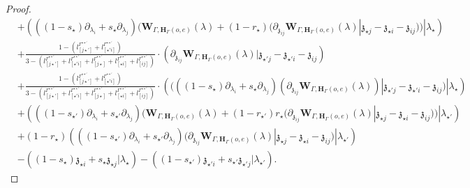 \documentclass[11pt]{amsart}
\theoremstyle{definition}
\theoremstyle{remark}
\numberwithin{equation}{section}
\begin{document}
\begin{proof}
\begin{align*}
&+\left(((1-s_{\star})\partial_{\lambda_i}+s_{\star}\partial_{\lambda_j})(\mathbf{W}_{\Gamma,\mathbf{H}_{\Gamma}(o,e)}(\lambda)+(1-r_{\star})(\partial_{\mathfrak{z}_{ij}}\mathbf{W}_{\Gamma,\mathbf{H}_{\Gamma}(o,e)}(\lambda)|\mathfrak{z}_{\star j}-\mathfrak{z}_{\star i}-\mathfrak{z}_{ij}))|\lambda_{\star}\right)\\
&+\frac{1-(l^{\Gamma^{\star\star'}}_{[ j\star']}+l^{\Gamma^{\star\star'}}_{[ \star 'i]})}{3-(l^{\Gamma^{\star\star'}}_{[ j\star']}+l^{\Gamma^{\star\star'}}_{[ \star 'i]}+l^{\Gamma^{\star\star'}}_{[ j\star]}+l^{\Gamma^{\star\star'}}_{[ \star i]}+l^{\Gamma^{\star\star'}}_{[ ij]})}\cdot\left(\partial_{\mathfrak{z}_{ij}}\mathbf{W}_{\Gamma,\mathbf{H}_{\Gamma}(o,e)}(\lambda)|\mathfrak{z}_{\star' j}-\mathfrak{z}_{\star' i}-\mathfrak{z}_{ij}\right)\\
&+\frac{1-(l^{\Gamma^{\star\star'}}_{[ j\star']}+l^{\Gamma^{\star\star'}}_{[ \star 'i]})}{3-(l^{\Gamma^{\star\star'}}_{[ j\star']}+l^{\Gamma^{\star\star'}}_{[ \star 'i]}+l^{\Gamma^{\star\star'}}_{[ j\star]}+l^{\Gamma^{\star\star'}}_{[ \star i]}+l^{\Gamma^{\star\star'}}_{[ ij]})}\cdot \left((((1-s_{\star})\partial_{\lambda_i}+s_{\star}\partial_{\lambda_j})(\partial_{\mathfrak{z}_{ij}}\mathbf{W}_{\Gamma,\mathbf{H}_{\Gamma}(o,e)}(\lambda))|\mathfrak{z}_{\star' j}-\mathfrak{z}_{\star' i}-\mathfrak{z}_{ij})|\lambda_{\star}\right)\\
 &  +\left(((1-s_{\star'})\partial_{\lambda_i}+s_{\star'}\partial_{\lambda_j})(\mathbf{W}_{\Gamma,\mathbf{H}_{\Gamma}(o,e)}(\lambda)+(1-r_{\star'})r_{\star}(\partial_{\mathfrak{z}_{ij}}\mathbf{W}_{\Gamma,\mathbf{H}_{\Gamma}(o,e)}(\lambda)|\mathfrak{z}_{\star j}-\mathfrak{z}_{\star i}-\mathfrak{z}_{ij}))|\lambda_{\star'}\right)\\
   &+(1-r_{\star})\left(((1-s_{\star'})\partial_{\lambda_i}+s_{\star'}\partial_{\lambda_j})(\partial_{\mathfrak{z}_{ij}}\mathbf{W}_{\Gamma,\mathbf{H}_{\Gamma}(o,e)}(\lambda)|\mathfrak{z}_{\star j}-\mathfrak{z}_{\star i}-\mathfrak{z}_{ij})|\lambda_{\star'}\right)\\
   &-\left((1-s_{\star})\mathfrak{z}_{\star i}+s_{\star}\mathfrak{z}_{\star j}|\lambda_{\star}\right)-\left((1-s_{\star'})\mathfrak{z}_{\star' i}+s_{\star'}\mathfrak{z}_{\star' j}|\lambda_{\star'}\right).
\end{align*}
\fi


\end{proof}
\end{document}

